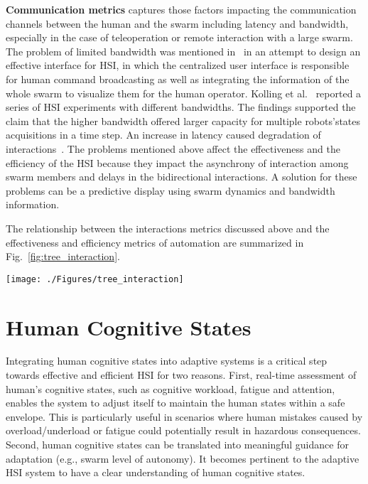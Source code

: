 \documentclass[journal]{IEEEtran}
\begin{document}
\textbf{Communication metrics} captures those factors impacting the communication channels between the human and the swarm including latency and bandwidth, especially in the case of teleoperation or remote interaction with a large swarm. The problem of limited bandwidth was mentioned in~\cite{mclurkin2006speaking} in an attempt to design an effective interface for HSI, in which the centralized user interface is responsible for human command broadcasting as well as integrating the information of the whole swarm to visualize them for the human operator. Kolling et al.~\cite{kolling2016human} reported a series of HSI experiments with different bandwidths. The findings supported the claim that the higher bandwidth offered larger capacity for multiple robots\textquoteright  states acquisitions in a time step. An increase in latency caused degradation of interactions~\cite{steinfeld2006common,walker2012neglect}. The problems mentioned above affect the effectiveness and the efficiency of the HSI because they impact the asynchrony of interaction among swarm members and delays in the bidirectional interactions. A solution for these problems can be a predictive display using swarm dynamics and bandwidth information.

The relationship between the interactions metrics discussed above and the effectiveness and efficiency metrics of automation are summarized in Fig.~\ref{fig:tree_interaction}.

\begin{figure*}[tp]
\centering
\texttt{[image: ./Figures/tree\_interaction]}
\caption{An example of a set of interaction indicators.}
\label{fig:tree_interaction}
\end{figure*}


\section{Human Cognitive States}
\label{humanSubSection}

Integrating human cognitive states into adaptive systems is a critical step towards effective and efficient HSI for two reasons. First, real-time assessment of human\textquoteright s cognitive states, such as cognitive workload, fatigue and attention, enables the system to adjust itself to maintain the human states within a safe envelope. This is particularly useful in scenarios where human mistakes caused by overload/underload or fatigue could potentially result in hazardous consequences. Second, human cognitive states can be translated into meaningful guidance for adaptation (e.g., swarm level of autonomy). It becomes pertinent to the adaptive HSI system to have a clear understanding of human cognitive states. 
\end{document}
